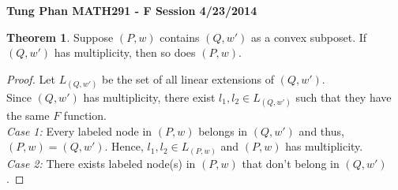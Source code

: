 \documentclass[12pt]{article}
\theoremstyle{definition}
\newtheorem{theorem}{Theorem}
\begin{document}
\pagestyle{empty}

\flushleft


\textbf{Tung Phan \hfill MATH291 - F Session \hfill 4/23/2014}

\vspace{4ex}

\begin{theorem}
Suppose $(P, w)$ contains $(Q, w')$ as a convex subposet. If $(Q, w')$ has multiplicity, then so does $(P,w)$.
\end{theorem}

\begin{proof}
Let $L_{(Q,w')}$ be the set of all linear extensions of $(Q,w')$.\\
Since $(Q,w')$ has multiplicity, there exist $l_1, l_2 \in L_{(Q,w')}$ such that they have the same $F$ function. \\
\textit{Case 1:} Every labeled node in $(P,w)$ belongs in $(Q,w')$ and thus, $(P,w) = (Q,w')$. Hence, $l_1, l_2 \in L_{(P,w)}$ and $(P,w)$ has multiplicity.\\
\textit{Case 2:} There exists labeled node(s) in $(P,w)$ that don't belong in $(Q,w')$. 

\end{proof}
\end{document}
